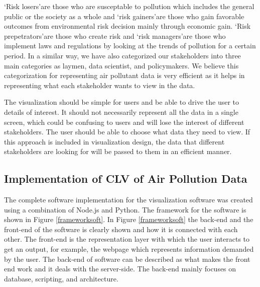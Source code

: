 
\lq{Risk losers}\rq are those who are susceptable to pollution which includes the general public or the society as a whole and \lq{risk gainers}\rq are those who gain  favorable outcomes from environmental risk  decision mainly through economic gain. \lq{Risk prepetrators}\rq are those who create risk and \lq{risk managers}\rq are those who implement laws and regulations by looking at the trends of pollution for a certain period. 
In a similar way, we have also categorized our stakeholders into three main categories as laymen, data scientist, and policymakers. We believe this categorization for representing air pollutant data is very efficient as it helps in representing what each stakeholder wants to view in the data.

The visualization should be simple for users and be able to drive the user to details of interest. It should not necessarily represent all the data in a single screen, which could be confusing to users and will lose the interest of different stakeholders. The user should be able to choose what data they need to view. If this approach is included in visualization design, the data that different stakeholders are looking for will be passed to them in an efficient manner. %

\subsection{Implementation of CLV of Air Pollution Data}

The complete software implementation for the visualization software was created using a combination of Node.js and Python. The framework for the software is shown in Figure \ref{frameworksoft}. In Figure \ref{frameworksoft} the back-end and the front-end of the software is clearly shown and how it is connected with each other. The front-end is the representation layer with which the user interacts to get an output, for example, the webpage which represents information demanded by the user. The back-end of software can be described as what makes the front end work and it deals with the server-side. The back-end mainly  focuses on database, scripting, and architecture.



